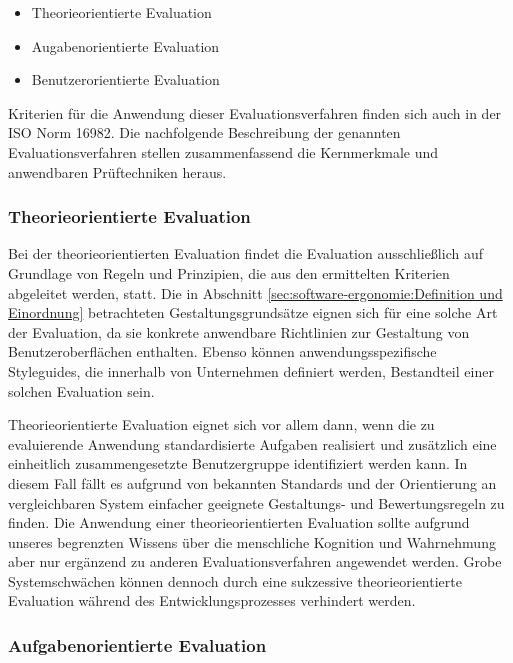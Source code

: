 \begin{itemize}
\item Theorieorientierte Evaluation
\item Augabenorientierte Evaluation
\item Benutzerorientierte Evaluation
\end{itemize}

Kriterien für die Anwendung dieser Evaluationsverfahren finden sich auch in der ISO Norm 16982. Die nachfolgende Beschreibung der genannten Evaluationsverfahren stellen zusammenfassend die Kernmerkmale und anwendbaren Prüftechniken heraus.

\subsubsection{Theorieorientierte Evaluation}

Bei der theorieorientierten Evaluation findet die Evaluation ausschließlich auf Grundlage von Regeln und Prinzipien, die aus den ermittelten Kriterien abgeleitet werden, statt. \parencite[vgl.][208]{Herczeg2009} Die in Abschnitt \ref{sec:software-ergonomie:Definition und Einordnung} betrachteten Gestaltungsgrundsätze eignen sich für eine solche Art der Evaluation, da sie konkrete anwendbare Richtlinien zur Gestaltung von Benutzeroberflächen enthalten. Ebenso können anwendungsspezifische Styleguides, die innerhalb von Unternehmen definiert werden, Bestandteil einer solchen Evaluation sein.

Theorieorientierte Evaluation eignet sich vor allem dann, wenn die zu evaluierende Anwendung standardisierte Aufgaben realisiert und zusätzlich eine einheitlich zusammengesetzte Benutzergruppe identifiziert werden kann. In diesem Fall fällt es aufgrund von bekannten Standards und der Orientierung an vergleichbaren System einfacher geeignete Gestaltungs- und Bewertungsregeln zu finden. Die Anwendung einer theorieorientierten Evaluation sollte aufgrund unseres begrenzten Wissens über die menschliche Kognition und Wahrnehmung aber nur ergänzend zu anderen Evaluationsverfahren angewendet werden. \parencite[vgl.][209]{Herczeg2009} Grobe Systemschwächen können dennoch durch eine sukzessive theorieorientierte Evaluation während des Entwicklungsprozesses verhindert werden.

\subsubsection{Aufgabenorientierte Evaluation}


